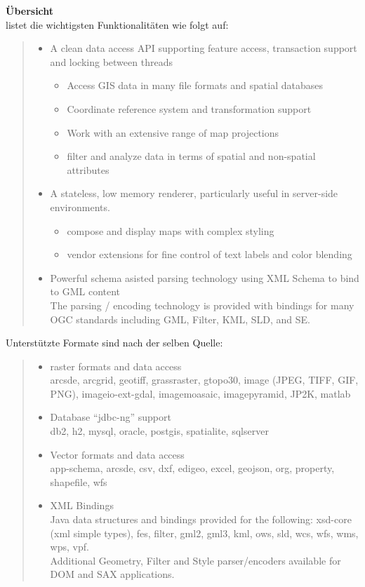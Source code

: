 \label{appendix-B}
\textbf{Übersicht}\\
\cite{website:geotools} listet die wichtigsten Funktionalitäten wie folgt auf:
\begin{quote}
\begin{itemize}
\item A clean data access API supporting feature access, transaction support and locking between threads
\begin{itemize}
\item Access GIS data in many file formats and spatial databases
\item Coordinate reference system and transformation support
\item Work with an extensive range of map projections
\item filter and analyze data in terms of spatial and non-spatial attributes
\end{itemize}
\item A stateless, low memory renderer, particularly useful in server-side environments.
\begin{itemize}
\item compose and display maps with complex styling
\item vendor extensions for fine control of text labels and color blending
\end{itemize}
\item Powerful schema asisted parsing technology using XML Schema to bind to GML content\\
The parsing / encoding technology is provided with bindings for many OGC standards including GML, Filter, KML, SLD, and SE.
\end{itemize}
\end{quote}
Unterstützte Formate sind nach der selben Quelle:
\begin{quote}
\begin{itemize}
\item raster formats and data access\\
arcsde, arcgrid, geotiff, grassraster, gtopo30, image (JPEG, TIFF, GIF, PNG), imageio-ext-gdal, imagemoasaic, imagepyramid, JP2K, matlab
\item Database “jdbc-ng” support\\
db2, h2, mysql, oracle, postgis, spatialite, sqlserver
\item Vector formats and data access\\
app-schema, arcsde, csv, dxf, edigeo, excel, geojson, org, property, shapefile, wfs
\item XML Bindings\\
Java data structures and bindings provided for the following: xsd-core (xml simple types), fes, filter, gml2, gml3, kml, ows, sld, wcs, wfs, wms, wps, vpf.\\
Additional Geometry, Filter and Style parser/encoders available for DOM and SAX applications.
\end{itemize}
\end{quote}
 
